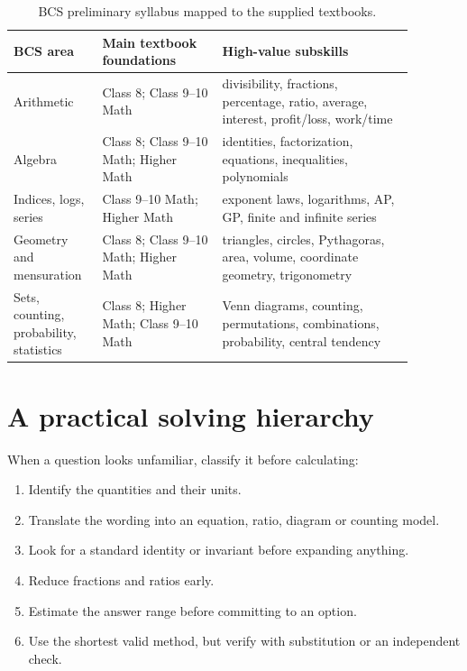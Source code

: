 \documentclass[12pt,a4paper,oneside]{book}
\begin{document}
\begin{table}[htbp]
\centering
\caption{BCS preliminary syllabus mapped to the supplied textbooks.}
\label{tab:syllabus-map}
\small
\begin{tabular}{@{}>{\raggedright\arraybackslash}p{0.18\linewidth}>{\raggedright\arraybackslash}p{0.27\linewidth}>{\raggedright\arraybackslash}p{0.43\linewidth}@{}}
\toprule
BCS area & Main textbook foundations & High-value subskills \\
\midrule
Arithmetic & Class 8; Class 9--10 Math & divisibility, fractions, percentage, ratio, average, interest, profit/loss, work/time \\
Algebra & Class 8; Class 9--10 Math; Higher Math & identities, factorization, equations, inequalities, polynomials \\
Indices, logs, series & Class 9--10 Math; Higher Math & exponent laws, logarithms, AP, GP, finite and infinite series \\
Geometry and mensuration & Class 8; Class 9--10 Math; Higher Math & triangles, circles, Pythagoras, area, volume, coordinate geometry, trigonometry \\
Sets, counting, probability, statistics & Class 8; Higher Math; Class 9--10 Math & Venn diagrams, counting, permutations, combinations, probability, central tendency \\
\bottomrule
\end{tabular}
\end{table}

\section{A practical solving hierarchy}
When a question looks unfamiliar, classify it before calculating:
\begin{enumerate}[label=\arabic*.]
  \item Identify the quantities and their units.
  \item Translate the wording into an equation, ratio, diagram or counting model.
  \item Look for a standard identity or invariant before expanding anything.
  \item Reduce fractions and ratios early.
  \item Estimate the answer range before committing to an option.
  \item Use the shortest valid method, but verify with substitution or an independent check.
\end{enumerate}
\end{document}
